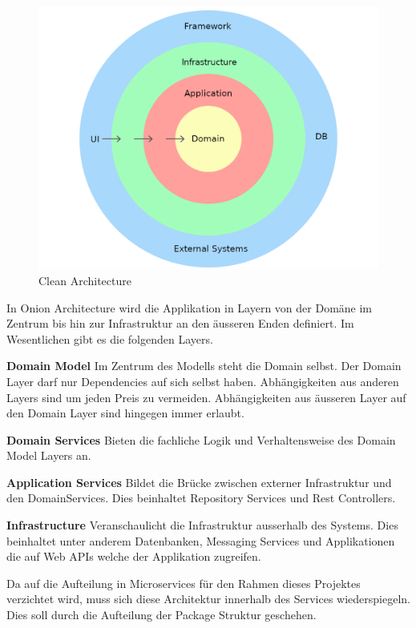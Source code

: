 \begin{figure}[h]
    \centering
    \begin{minipage}[b]{0.5\textwidth}
        \includegraphics[width=\textwidth]{graphics/clean-architecture}
        \caption{Clean Architecture}
    \end{minipage}
\end{figure}

In Onion Architecture wird die Applikation in Layern von der Domäne im Zentrum bis hin zur Infrastruktur an den äusseren Enden definiert.
Im Wesentlichen gibt es die folgenden Layers\cite{medium-onion}.

\textbf{Domain Model}
Im Zentrum des Modells steht die Domain selbst.
Der Domain Layer darf nur Dependencies auf sich selbst haben.
Abhängigkeiten aus anderen Layers sind um jeden Preis zu vermeiden.
Abhängigkeiten aus äusseren Layer auf den Domain Layer sind hingegen immer erlaubt.

\textbf{Domain Services}
Bieten die fachliche Logik und Verhaltensweise des Domain Model Layers an.

\textbf{Application Services}
Bildet die Brücke zwischen externer Infrastruktur und den DomainServices.
Dies beinhaltet Repository Services und Rest Controllers.

\textbf{Infrastructure}
Veranschaulicht die Infrastruktur ausserhalb des Systems.
Dies beinhaltet unter anderem Datenbanken, Messaging Services und Applikationen die auf Web APIs welche der Applikation zugreifen.

Da auf die Aufteilung in Microservices für den Rahmen dieses Projektes verzichtet wird, muss sich diese Architektur innerhalb des Services wiederspiegeln.
Dies soll durch die Aufteilung der Package Struktur geschehen.

